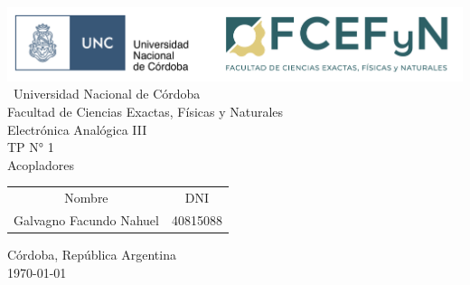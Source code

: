 \begin{titlepage}

\begin{center}
    \includegraphics[width=15cm]{fig/color_UNC-FCEFyN.png} 
    \\[1cm]
    \vspace{5pt}
    \ \LARGE Universidad Nacional de Córdoba\\[0.5cm] 
    \large Facultad de Ciencias Exactas, Físicas y Naturales \\[0.5cm] 
    \large Electrónica Analógica III
    \\[0.2cm]
    \large TP N° 1
    \\[0.2cm]
    \large Acopladores
    \\[0.2cm]
    \vspace{360pt}
    \begin{table}[!h]
    \centering
    \begin{tabular}{ll}
    \multicolumn{1}{c}{Nombre} & \multicolumn{1}{c}{DNI} \\
    Galvagno Facundo Nahuel& 40815088 \\
    
    \end{tabular}
    \end{table}
\vfill Córdoba, República Argentina\\ \today
\end{center}

\end{titlepage}